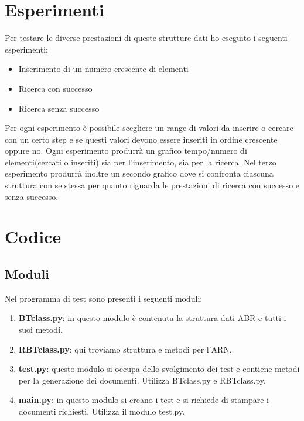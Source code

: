 \documentclass{article}
\begin{document}
\section{Esperimenti}
Per testare le diverse prestazioni di queste strutture dati ho eseguito i seguenti esperimenti:
\begin{itemize}
    \item Inserimento di un numero crescente di elementi 
    \item Ricerca con successo  
    \item Ricerca senza successo
\end{itemize}
Per ogni esperimento è possibile scegliere un range di valori da inserire o cercare con un certo step e se questi valori devono essere inseriti in ordine crescente oppure no. Ogni esperimento produrrà un grafico tempo/numero di elementi(cercati o inseriti) sia per l'inserimento, sia per la ricerca. Nel terzo esperimento produrrà inoltre un secondo grafico dove si confronta ciascuna struttura con se stessa per quanto riguarda le prestazioni di ricerca con successo e senza successo.

\section{Codice}
\subsection{Moduli}
Nel programma di test sono presenti i seguenti moduli:
\begin{enumerate}
    \item \textbf{BTclass.py}: in questo modulo è contenuta la struttura dati ABR e tutti i suoi metodi.
    \item \textbf{RBTclass.py}: qui troviamo struttura e metodi per l'ARN.
    \item \textbf{test.py}: questo modulo si occupa dello svolgimento dei test e contiene metodi per la generazione dei documenti. Utilizza BTclass.py e RBTclass.py.
    \item \textbf{main.py}: in questo modulo si creano i test e si richiede di stampare i documenti richiesti. Utilizza il modulo test.py. 
\end{enumerate}
\end{document}
